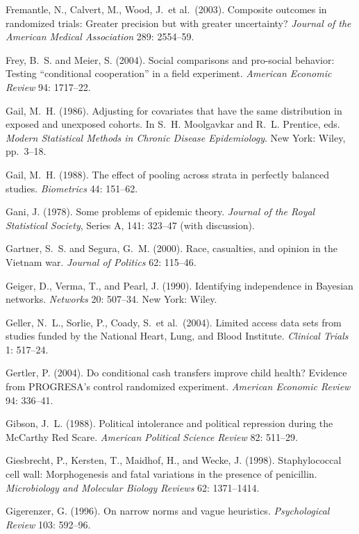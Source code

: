\smallskip\noindent
Fremantle, N., Calvert, M., Wood, J.~et al.~(2003).
Composite outcomes in randomized trials: Greater precision but with greater uncertainty?
{\it Journal of the American Medical Association\/} 289: 2554--59.

\smallskip\noindent
Frey, B.~S. and Meier, S. (2004).
Social comparisons and pro-social behavior:
Testing ``conditional cooperation'' in a field experiment.
{\it American Economic Review\/} {94}: 1717--22.

\smallskip\noindent
Gail, M.~H. (1986).
Adjusting for covariates that have the same distribution in exposed and unexposed cohorts.
In S.~H. Moolgavkar and R.~L. Prentice, eds.
{\it Modern Statistical Methods in Chronic Disease Epidemiology\/}.
New York: Wiley, pp.~3--18.

\smallskip\noindent
Gail, M.~H. (1988).
The effect of pooling across strata in perfectly balanced studies.
{\it Biometrics\/} {44}: 151--62.

\smallskip\noindent
Gani, J. (1978).
Some problems of epidemic theory.
{\it Journal of the Royal Statistical Society\/},
Series A, 141: 323--47 (with discussion).

\smallskip\noindent
Gartner, S.~S. and Segura, G.~M. (2000).
Race, casualties, and opinion in the Vietnam war.
{\it Journal of Politics\/} 62: 115--46.

\smallskip\noindent
Geiger, D., Verma, T., and Pearl, J. (1990).
Identifying independence in Bayes\-ian networks.
{\it Networks\/} 20: 507--34.
New York: Wiley.

\smallskip\noindent
Geller, N.~L., Sorlie, P., Coady, S.~et al.~(2004).
Limited access data sets from studies funded by the National Heart, Lung, and Blood Institute.
{\it Clinical Trials\/} 1: 517--24.

\smallskip\noindent
Gertler, P. (2004).
Do conditional cash transfers improve child health?
Evidence from PROGRESA's control randomized experiment.
{\it American Economic Review\/} 94: 336--41.

\smallskip\noindent
Gibson, J.~L. (1988).
Political intolerance and political repression during the McCarthy Red Scare.
{\it American Political Science Review\/} 82: 511--29.

\smallskip\noindent
Giesbrecht, P., Kersten, T., Maidhof, H., and Wecke, J. (1998).
Staphylococcal cell wall: Morphogenesis and fatal variations in the presence of penicillin.
{\it Microbiology and Molecular Biology Reviews\/} 62: 1371--1414.

\smallskip\noindent
Gigerenzer, G. (1996).
On narrow norms and vague heuristics.
{\it Psychological Review\/} 103: 592--96.

